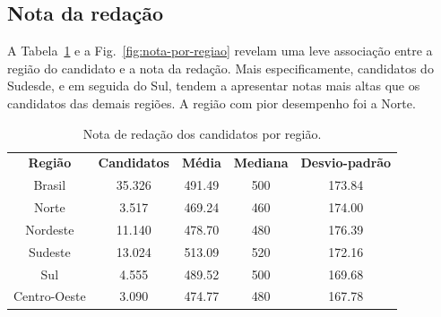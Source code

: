 \documentclass[12pt]{article}
\newcommand{\reffig}[1]{Fig.~\ref{fig:#1}}
\newcommand{\reftab}[1]{Tabela~\ref{tab:#1}}
\begin{document}
\subsection{Nota da redação}
A \reftab{nota-por-regiao} e a \reffig{nota-por-regiao} revelam uma leve associação entre a região do candidato e a nota da redação. Mais especificamente, candidatos do Sudesde, e em seguida do Sul, tendem a apresentar notas mais altas que os candidatos das demais regiões. A região com pior desempenho foi a Norte.

\begin{minipage}{.5\textwidth}
    \begin{table}[H]
    \begin{tabular}{ c c c c c }
      \textbf{Região}  & \textbf{Candidatos} & \textbf{Média} & \textbf{Mediana} & \textbf{Desvio-padrão} \\
      Brasil           & 35.326              & 491.49          & 500             & 173.84 \\
      Norte            & 3.517               & 469.24          & 460             & 174.00 \\
      Nordeste         & 11.140              & 478.70          & 480             & 176.39 \\
      Sudeste          & 13.024              & 513.09          & 520             & 172.16 \\
      Sul              & 4.555               & 489.52          & 500             & 169.68 \\
      Centro-Oeste     & 3.090               & 474.77          & 480             & 167.78 \\
    \end{tabular}
    \caption{Nota de redação dos candidatos por região.}
    \label{tab:nota-por-regiao}
    \end{table}
\end{minipage}%
\end{document}
